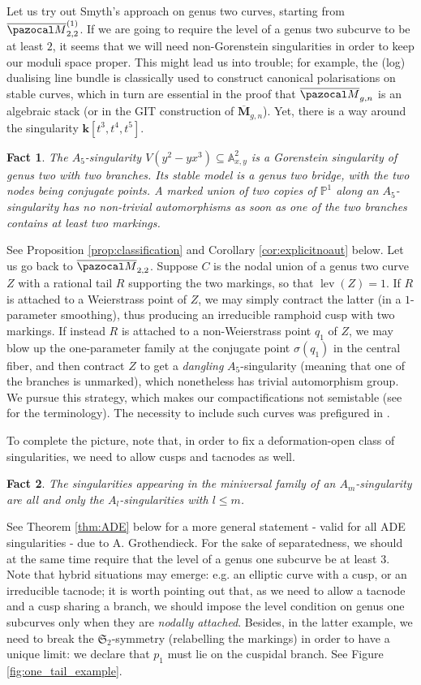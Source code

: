 \documentclass[11pt]{amsart}
\newcommand{\PP}{\mathbb P}
\renewcommand{\k}{\mathbf k}
\newcommand{\Aaff}{\mathbb A}
\newcommand{\oM}{\overline{\pazocal M}}
\newcommand{\lev}{\operatorname{lev}}
\theoremstyle{plain}
\newtheorem*{fact}{Fact}
\theoremstyle{definition}
\begin{document}
Let us try out Smyth's approach on genus two curves, starting from $\oM_{2,2}^{(1)}$. If we are going to require the level of a genus two subcurve to be at least $2$, it seems that we will need non-Gorenstein singularities in order to keep our moduli space proper. This might lead us into trouble; for example, the (log) dualising line bundle is classically used to construct canonical polarisations on stable curves, which in turn are essential in the proof that $\oM_{g,n}$ is an algebraic stack (or in the GIT construction of $\overline{\mathbf M}_{g,n}$). Yet, there is a way around the singularity $\k[t^3,t^4,t^5]$.
\begin{fact}
 The $A_5$-singularity $V(y^2-yx^3)\subseteq\Aaff^2_{x,y}$ is a Gorenstein singularity of genus two with two branches. Its stable model is a genus two bridge, with the two nodes being conjugate points. A marked union of two copies of $\PP^1$ along an $A_5$-singularity has no non-trivial automorphisms as soon as one of the two branches contains at least two markings.
\end{fact}
See Proposition \ref{prop:classification} and Corollary \ref{cor:explicitnoaut} below. Let us go back to $\oM_{2,2}$. Suppose $C$ is the nodal union of a genus two curve $Z$ with a rational tail $R$ supporting the two markings, so that $\lev(Z)=1$. If $R$ is attached to a Weierstrass point of $Z$, we may simply contract the latter (in a $1$-parameter smoothing), thus producing an irreducible ramphoid cusp with two markings. If instead $R$ is attached to a non-Weierstrass point $q_1$ of $Z$, we may blow up the one-parameter family at the conjugate point $\sigma(q_1)$ in the central fiber, and then contract $Z$ to get a \emph{dangling} $A_5$-singularity (meaning that one of the branches is unmarked), which nonetheless has trivial automorphism group. We pursue this strategy, which makes our compactifications not semistable (see \cite[Definition 1.2]{SMY-towards} for the terminology). The necessity to include such curves was prefigured in \cite{AFSGm}.

To complete the picture, note that, in order to fix a deformation-open class of singularities, we need to allow cusps and tacnodes as well.
\begin{fact}
 The singularities appearing in the miniversal family of an $A_m$-singularity are all and only the $A_l$-singularities with $l\leq m$.
\end{fact}
See Theorem \ref{thm:ADE} below for a more general statement - valid for all ADE singularities - due to A. Grothendieck. For the sake of separatedness, we should at the same time require that the level of a genus one subcurve be at least $3$. Note that hybrid situations may emerge: e.g. an elliptic curve with a cusp, or an irreducible tacnode; it is worth pointing out that, as we need to allow a tacnode and a cusp sharing a branch, we should impose the level condition on genus one subcurves only when they are \emph{nodally attached}. Besides, in the latter example, we need to break the $\mathfrak S_2$-symmetry (relabelling the markings) in order to have a unique limit: we declare that $p_1$ must lie on the cuspidal branch. See Figure \ref{fig:one_tail_example}.
\end{document}
